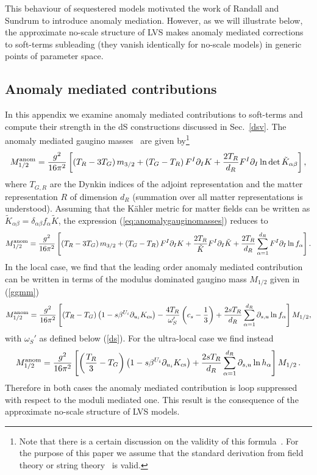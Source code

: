 \documentclass[11pt,a4paper]{article}
\newcommand{\be}{\begin{equation}}
\newcommand{\ee}{\end{equation}}
\begin{document}
This behaviour of sequestered models motivated the work of Randall and Sundrum to introduce anomaly mediation.
However, as we will illustrate below, the approximate no-scale structure of LVS makes anomaly mediated corrections
to soft-terms subleading (they vanish identically for no-scale models) in generic points of parameter space.


\subsection{Anomaly mediated contributions}
\label{anosec}

In this appendix we examine anomaly mediated contributions to soft-terms and compute their strength
in the dS constructions discussed in Sec.~\ref{dsv}. The anomaly mediated gaugino masses~\cite{Bagger:1999rd} are given by\footnote{Note that there is a certain discussion on the validity of this formula~\cite{deAlwis:2008aq}. For the purpose of this paper we assume that the standard derivation from field theory or string theory~\cite{Conlon:2010qy} is valid.}
\be
M_{1/2}^{\rm anom}=\frac{g^2}{16 \pi^2}\left[\left(T_R-3T_G\right)m_{3/2}+\left(T_G-T_R\right)F^I\partial_I K
+\frac{2T_R}{d_R}F^I\partial_I\ln\det \tilde{K}_{\alpha\beta}\right],
\label{eq:anomalygauginomasses}
\ee
where $T_{G,R}$ are the Dynkin indices of the adjoint representation
and the matter representation $R$ of dimension $d_R$ (summation over all matter representations is understood).
Assuming that the K\"ahler metric for matter fields can be written as $\tilde{K}_{\alpha\beta}=\delta_{\alpha\beta} f_\alpha\tilde{K}$,
the expression (\ref{eq:anomalygauginomasses}) reduces to
\be
M_{1/2}^{\rm anom}=\frac{g^2}{16 \pi^2}\left[\left(T_R-3T_G\right)m_{3/2}+\left(T_G-T_R\right)F^I\partial_I K
+\frac{2T_R}{\tilde{K}} F^I\partial_I\tilde{K}+\frac{2T_R}{d_R}\sum_{\alpha=1}^{d_R} F^I\partial_I\ln f_\alpha\right].
\label{eq:anomalygauginomasses2}
\ee
In the local case, we find that the leading order anomaly mediated contribution can be written in terms
of the modulus dominated gaugino mass $M_{1/2}$ given in (\ref{ggmm})
\be
M_{1/2}^{\rm anom} = \frac{g^2}{16\pi^2} \left[\left(T_R - T_G\right)\left(1-s\beta^{U_i}\partial_{u_i} K_{\rm cs}\right)
- \frac{4 T_R}{\omega_S'} \left(c_s-\frac 13 \right)+\frac{2sT_R}{d_R}\sum_{\alpha=1}^{d_R} \partial_{s,u}\ln f_\alpha\right] M_{1/2},
\label{anorel}
\ee
with $\omega_S'$ as defined below (\ref{ds}). For the ultra-local case we find instead
\be
M_{1/2}^{\rm anom} = \frac{g^2}{16\pi^2} \left[\left(\frac{T_R}{3} - T_G\right)\left(1-s\beta^{U_i}\partial_{u_i} K_{\rm cs}\right)
+\frac{2sT_R}{d_R}\sum_{\alpha=1}^{d_R} \partial_{s,u}\ln h_\alpha\right] M_{1/2}\, .
\label{anorel2}
\ee
Therefore in both cases the anomaly mediated contribution is loop suppressed with respect to the moduli mediated one.
This result is the consequence of the approximate no-scale structure of LVS models.
\end{document}
